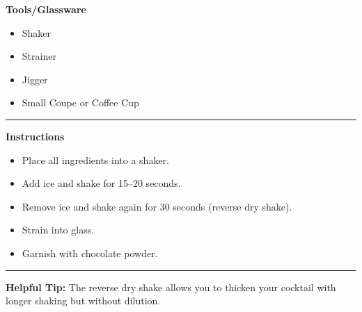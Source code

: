 \hspace{.01\textwidth}\vrule\hspace{.01\textwidth}
\begin{minipage}[t]{.49\textwidth}
    \noindent
    \textbf{\large Tools/Glassware}
    \begin{itemize}
        \item Shaker
        \item Strainer
        \item Jigger
        \item Small Coupe or Coffee Cup
    \end{itemize}
\end{minipage}
\vspace{.5em}\hrule\vspace{.5em}
\noindent
\begin{minipage}{\textwidth}
    \noindent
    \textbf{\large Instructions}
    \begin{itemize}
        \item Place all ingredients into a shaker.
        \item Add ice and shake for 15--20 seconds.
        \item Remove ice and shake again for 30 seconds (reverse dry shake).
        \item Strain into glass.
        \item Garnish with chocolate powder.
    \end{itemize}
\end{minipage}
\vspace{.5em}\hrule\vspace{.5em}
\noindent
\textbf{\large Helpful Tip:} The reverse dry shake allows you to thicken your cocktail with longer shaking but without dilution.
\newpage
